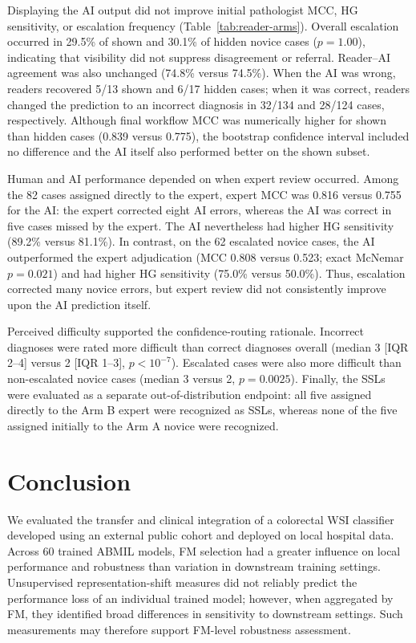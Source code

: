 \documentclass[runningheads]{llncs}
\begin{document}
Displaying the AI output did not improve initial pathologist MCC, HG
sensitivity, or escalation frequency (Table~\ref{tab:reader-arms}).
Overall escalation occurred in 29.5\% of shown and 30.1\% of hidden novice
cases ($p=1.00$), indicating that visibility did not suppress disagreement
or referral. Reader--AI agreement was also unchanged (74.8\% versus 74.5\%).
When the AI was wrong, readers recovered 5/13 shown and 6/17 hidden cases;
when it was correct, readers changed the prediction to an incorrect diagnosis
in 32/134 and 28/124 cases, respectively. Although final workflow MCC was numerically
higher for shown than hidden cases (0.839 versus 0.775), the bootstrap
confidence interval included no difference and the AI itself also performed
better on the shown subset.

Human and AI performance depended on when expert review occurred. Among the
82 cases assigned directly to the expert, expert MCC was 0.816
versus 0.755 for the AI: the expert corrected eight AI errors,
whereas the AI was correct in five cases missed by the expert. The AI
nevertheless had higher HG sensitivity (89.2\% versus 81.1\%). In contrast,
on the 62 escalated novice cases, the AI outperformed the expert adjudication
(MCC 0.808 versus 0.523; exact McNemar $p=0.021$) and had higher HG
sensitivity (75.0\% versus 50.0\%). Thus, escalation corrected many novice
errors, but expert review did not consistently improve upon the AI prediction
itself.

Perceived difficulty supported the confidence-routing rationale. Incorrect
diagnoses were rated more difficult than correct diagnoses overall
(median 3 [IQR 2--4] versus 2 [IQR 1--3], $p<10^{-7}$). Escalated cases were
also more difficult than non-escalated novice cases (median 3 versus 2,
$p=0.0025$). Finally, the SSLs were evaluated as a separate
out-of-distribution endpoint: all five assigned directly to the Arm B expert
were recognized as SSLs, whereas none of the five assigned initially to the
Arm A novice were recognized.

\section{Conclusion}
We evaluated the transfer and clinical integration of a colorectal WSI classifier
developed using an external public cohort and deployed on local hospital data.
Across 60 trained ABMIL models, FM selection had a greater influence on local
performance and robustness than variation in downstream training settings.
Unsupervised representation-shift measures did not reliably predict the
performance loss of an individual trained model; however, when aggregated by
FM, they identified broad differences in sensitivity to downstream settings.
Such measurements may therefore support FM-level robustness assessment.
\end{document}
